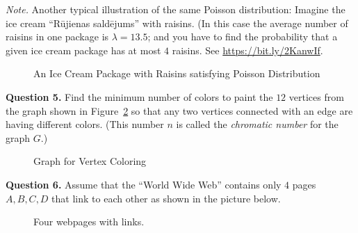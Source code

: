 \documentclass[jou]{apa6}
\begin{document}
{\em Note.} Another typical illustration of the same Poisson distribution: 
Imagine the ice cream ``R\={u}jienas sald\={e}jums'' with raisins. (In this case
the average number of raisins in one package is $\lambda = 13.5$; and you have to find the 
probability that a given ice cream package has at most $4$ raisins. 
See \url{https://bit.ly/2KanwIf}. 

\begin{figure}[!htb]
\caption{\label{fig:rujiena-icecream} An Ice Cream Package with Raisins satisfying Poisson Distribution}
\end{figure}



\vspace{10pt}
{\bf Question 5.} Find the minimum number of colors to paint the $12$ vertices
from the graph shown in Figure~\ref{fig:graph-coloring} so
that any two vertices connected with an edge are having different colors. 
(This number $n$ is called the {\em chromatic number} for the graph $G$.)

\begin{figure}[!htb]
\caption{\label{fig:graph-coloring} Graph for Vertex Coloring}
\end{figure}




\vspace{10pt}
{\bf Question 6.} Assume that the ``World Wide Web'' contains only 
$4$ pages $A,B,C,D$ that link to each other as shown in the picture below.


\begin{figure}[!htb]
\caption{\label{fig:pageranks} Four webpages with links.}
\end{figure}
\end{document}
